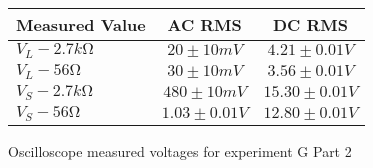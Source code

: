 \begin{figure}[H]    \centering    \begin{tabular}{|l|c|c|}
        \hline
        Measured Value & AC RMS & DC RMS \\
        \hline
        $V_{L} - 2.7\unit{k\ohm}$ & $20\pm 10\unit{mV}$ & $4.21\pm 0.01\unit{V}$ \\
        $V_{L} - 56\unit{\ohm}$ & $30\pm 10\unit{mV}$ & $3.56\pm 0.01\unit{V}$ \\
        $V_{S} - 2.7\unit{k\ohm}$ & $480\pm 10\unit{mV}$ & $15.30\pm 0.01\unit{V}$ \\
        $V_{S} - 56\unit{\ohm}$ & $1.03\pm 0.01\unit{V}$ & $12.80\pm 0.01\unit{V}$ \\
        \hline
    \end{tabular}    \caption{Oscilloscope measured voltages for experiment G Part 2}\end{figure}